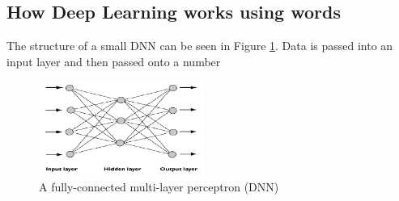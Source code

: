 \documentclass[a4paper]{article}
\begin{document}
\subsection{How Deep Learning works using words}
The structure of a small DNN can be seen in Figure \ref{DNN}. Data is passed into an input layer and then passed onto a number
\begin{figure}
	\begin{center}
    	\includegraphics[width=0.48\textwidth]{DNN}
    \end{center}
    \caption{A fully-connected multi-layer perceptron (DNN)}
    \label{DNN}
\end{figure}
\end{document}
